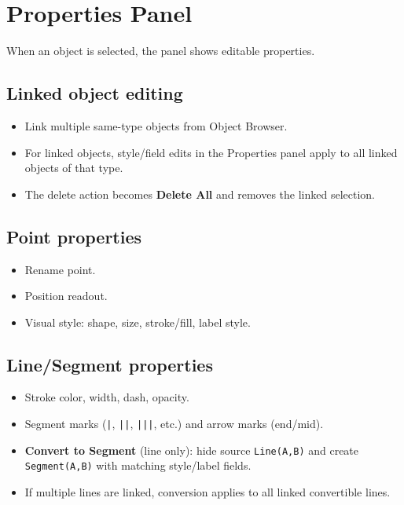 \documentclass[11pt,a4paper]{article}
\begin{document}
\section{Properties Panel}
When an object is selected, the panel shows editable properties.

\subsection{Linked object editing}
\begin{itemize}[leftmargin=1.5em]
  \item Link multiple same-type objects from Object Browser.
  \item For linked objects, style/field edits in the Properties panel apply to all linked objects of that type.
  \item The delete action becomes \textbf{Delete All} and removes the linked selection.
\end{itemize}

\subsection{Point properties}
\begin{itemize}[leftmargin=1.5em]
  \item Rename point.
  \item Position readout.
  \item Visual style: shape, size, stroke/fill, label style.
\end{itemize}

\subsection{Line/Segment properties}
\begin{itemize}[leftmargin=1.5em]
  \item Stroke color, width, dash, opacity.
  \item Segment marks (\texttt{|}, \texttt{||}, \texttt{|||}, etc.) and arrow marks (end/mid).
  \item \textbf{Convert to Segment} (line only): hide source \texttt{Line(A,B)} and create \texttt{Segment(A,B)} with matching style/label fields.
  \item If multiple lines are linked, conversion applies to all linked convertible lines.
\end{itemize}
\end{document}
